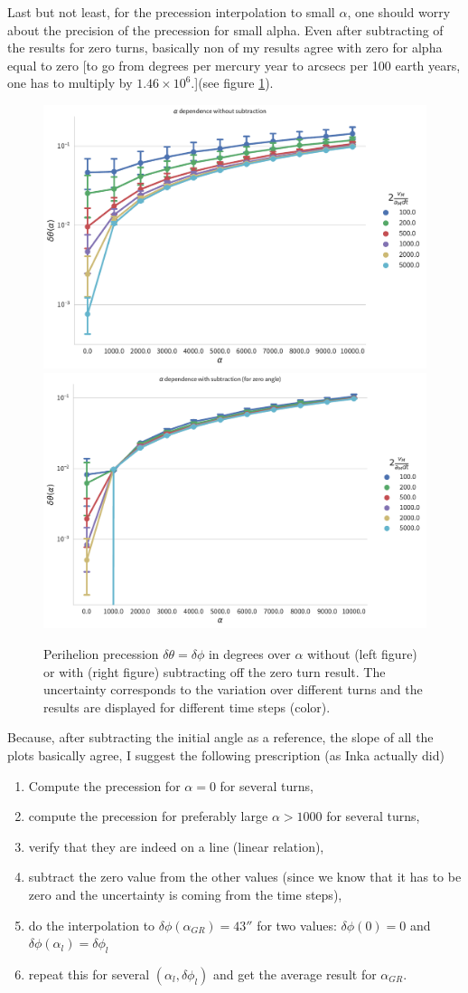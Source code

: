 \documentclass[12pt]{iopart}
\begin{document}
Last but not least, for the precession interpolation to small $\alpha$, one should worry about the precision of the precession for small alpha.
Even after subtracting of the results for zero turns, basically non of my results agree with zero for alpha equal to zero [to go from degrees per mercury year to arcsecs per 100 earth years, one has to multiply by $1.46 \times 10^{6}$.](see figure \ref{fcc4}).
\begin{figure}[htb]
	\centering
	\includegraphics[width=.4\textwidth]{figs/alpha_dependence_0}
	\includegraphics[width=.4\textwidth]{figs/alpha_dependence_1}
	\caption{\label{fcc4}Perihelion precession $\delta\theta = \delta\phi$ in degrees over $\alpha$ without (left figure) or with (right figure) subtracting off the zero turn result. The uncertainty corresponds to the variation over different turns and the results are displayed for different time steps (color).}
\end{figure}

Because, after subtracting the initial angle as a reference, the slope of all the plots basically agree, I suggest the following prescription (as Inka actually did)
\begin{enumerate}
	\item Compute the precession for $\alpha = 0$ for several turns,
	\item compute the precession for preferably large $\alpha > 1000$ for several turns,
	\item verify that they are indeed on a line (linear relation),
	\item subtract the zero value from the other values (since we know that it has to be zero and the uncertainty is coming from the time steps),
	\item do the interpolation to $\delta \phi (\alpha_{GR}) = 43''$ for two values: $\delta \phi (0) = 0$ and $\delta \phi (\alpha_l) = \delta \phi_l$
	\item repeat this for several $(\alpha_l, \delta \phi_l)$ and get the average result for $\alpha_{GR}$.	
\end{enumerate}
\end{document}
